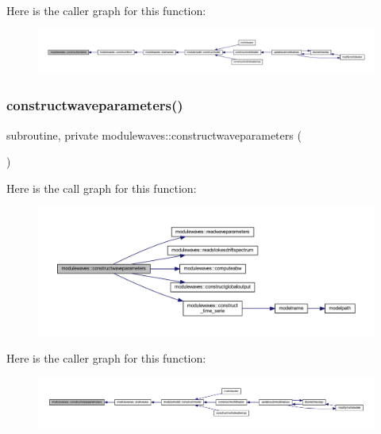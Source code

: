 Here is the caller graph for this function\+:\nopagebreak
\begin{figure}[H]
\begin{center}
\leavevmode
\includegraphics[width=350pt]{namespacemodulewaves_a509d19a4e531573684282a3b2e47fb4a_icgraph}
\end{center}
\end{figure}
\mbox{\label{namespacemodulewaves_a41194554ad5f331ce92bbcc1ac85a374}} 
\subsubsection{\texorpdfstring{constructwaveparameters()}{constructwaveparameters()}}
{\footnotesize\ttfamily subroutine, private modulewaves\+::constructwaveparameters (\begin{DoxyParamCaption}{ }\end{DoxyParamCaption})\hspace{0.3cm}{\ttfamily [private]}}

Here is the call graph for this function\+:\nopagebreak
\begin{figure}[H]
\begin{center}
\leavevmode
\includegraphics[width=350pt]{namespacemodulewaves_a41194554ad5f331ce92bbcc1ac85a374_cgraph}
\end{center}
\end{figure}
Here is the caller graph for this function\+:\nopagebreak
\begin{figure}[H]
\begin{center}
\leavevmode
\includegraphics[width=350pt]{namespacemodulewaves_a41194554ad5f331ce92bbcc1ac85a374_icgraph}
\end{center}
\end{figure}
\mbox{\label{namespacemodulewaves_ae0f81c5ccbee665024d621b4578f59ed}} 
